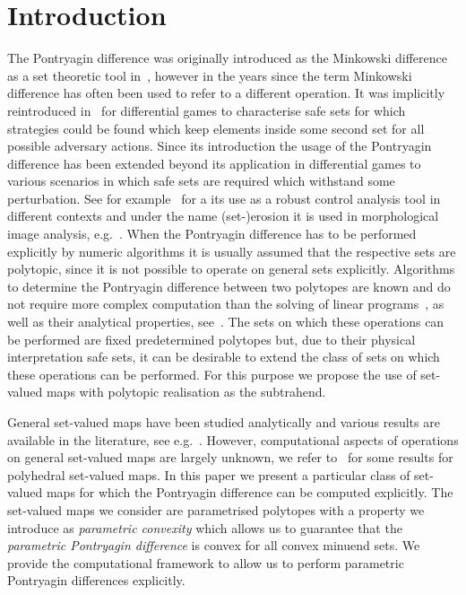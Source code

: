 \documentclass[final]{elsarticle}
\theoremstyle{remark}
\theoremstyle{definition}
\begin{document}
\section{Introduction}
%
The Pontryagin difference was originally introduced as the Minkowski difference as a set theoretic tool in~\cite{Hadwiger:1950,Hadwiger:1957}, however in the years since the term Minkowski difference has often been used to refer to a different operation.
%
It was implicitly reintroduced in~\cite{Pontryagin:1966} for differential games to characterise safe sets for which strategies could be found which keep elements inside some second set for all possible adversary actions.
%
Since its introduction the usage of the Pontryagin difference has been extended beyond its application in differential games to various scenarios in which safe sets are required which withstand some perturbation.
%
See for example~\cite{blanchini:2007} for a its use as a robust control analysis tool in different contexts and under the name (set-)erosion it is used in morphological image analysis, e.g.~\cite{Haralick:1987}.
%
When the Pontryagin difference has to be performed explicitly by numeric algorithms it is usually assumed that the respective sets are polytopic, since it is not possible to operate on general sets explicitly.
%
Algorithms to determine the Pontryagin difference between two polytopes are known and do not require more complex computation than the solving of linear programs~\cite{Kolmanovsky:1998,Kerrigan:2003}, as well as their analytical properties, see~\cite{blanchini:2007,Haralick:1987,Kolmanovsky:1998}.
%
The sets on which these operations can be performed are fixed predetermined polytopes but, due to their physical interpretation safe sets, it can be desirable to extend the class of sets on which these operations can be performed.
%
For this purpose we propose the use of set-valued maps with polytopic realisation as the subtrahend.

General set-valued maps have been studied analytically and various results are available in the literature, see e.g.~\cite{Aubin:2009}.
%
However, computational aspects of operations on general set-valued maps are largely unknown, we refer to~\cite{Finzel:2000} for some results for polyhedral set-valued maps.
%
In this paper we present a particular class of set-valued maps for which the Pontryagin difference can be computed explicitly.
%
The set-valued maps we consider are parametrised polytopes with a property we introduce as \emph{parametric convexity} which allows us to guarantee that the \emph{parametric Pontryagin difference} is convex for all convex minuend sets.
%
We provide the computational framework to allow us to perform parametric Pontryagin differences explicitly.
\end{document}
